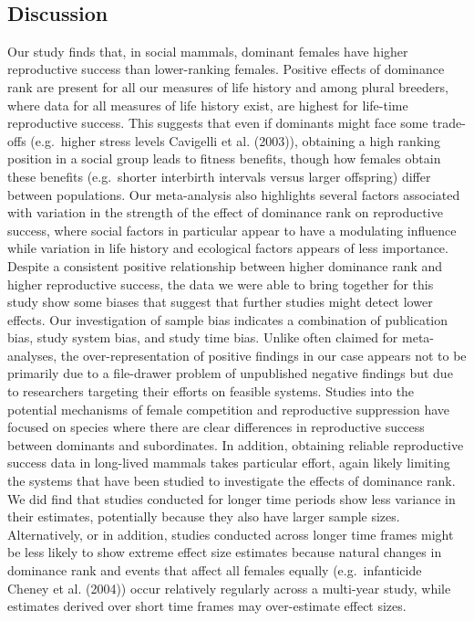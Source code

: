 \documentclass[
]{article}
\begin{document}
~

\hypertarget{discussion}{%
\subsection{Discussion}\label{discussion}}

Our study finds that, in social mammals, dominant females have higher
reproductive success than lower-ranking females. Positive effects of
dominance rank are present for all our measures of life history and
among plural breeders, where data for all measures of life history
exist, are highest for life-time reproductive success. This suggests
that even if dominants might face some trade-offs (e.g.~higher stress
levels Cavigelli et al. (2003)), obtaining a high ranking position in a
social group leads to fitness benefits, though how females obtain these
benefits (e.g.~shorter interbirth intervals versus larger offspring)
differ between populations. Our meta-analysis also highlights several
factors associated with variation in the strength of the effect of
dominance rank on reproductive success, where social factors in
particular appear to have a modulating influence while variation in life
history and ecological factors appears of less importance. Despite a
consistent positive relationship between higher dominance rank and
higher reproductive success, the data we were able to bring together for
this study show some biases that suggest that further studies might
detect lower effects. Our investigation of sample bias indicates a
combination of publication bias, study system bias, and study time bias.
Unlike often claimed for meta-analyses, the over-representation of
positive findings in our case appears not to be primarily due to a
file-drawer problem of unpublished negative findings but due to
researchers targeting their efforts on feasible systems. Studies into
the potential mechanisms of female competition and reproductive
suppression have focused on species where there are clear differences in
reproductive success between dominants and subordinates. In addition,
obtaining reliable reproductive success data in long-lived mammals takes
particular effort, again likely limiting the systems that have been
studied to investigate the effects of dominance rank. We did find that
studies conducted for longer time periods show less variance in their
estimates, potentially because they also have larger sample sizes.
Alternatively, or in addition, studies conducted across longer time
frames might be less likely to show extreme effect size estimates
because natural changes in dominance rank and events that affect all
females equally (e.g.~infanticide Cheney et al. (2004)) occur relatively
regularly across a multi-year study, while estimates derived over short
time frames may over-estimate effect sizes.
\end{document}
